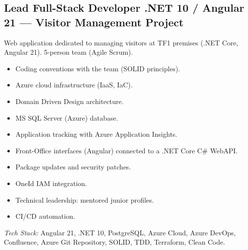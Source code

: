 \documentclass[10pt,a4paper]{article}
\begin{document}
\vspace{6pt}

\subsection*{Lead Full-Stack Developer .NET 10 / Angular 21 --- Visitor Management Project}
\color{darkgray}
Web application dedicated to managing visitors at TF1 premises (.NET Core, Angular 21). 5-person team (Agile Scrum).
\begin{itemize}
  \item Coding conventions with the team (SOLID principles).
  \item Azure cloud infrastructure (IaaS, IaC).
  \item Domain Driven Design architecture.
  \item MS SQL Server (Azure) database.
  \item Application tracking with Azure Application Insights.
  \item Front-Office interfaces (Angular) connected to a .NET Core C\# WebAPI.
  \item Package updates and security patches.
  \item OneId IAM integration.
  \item Technical leadership: mentored junior profiles.
  \item CI/CD automation.
\end{itemize}
\textit{Tech Stack:} Angular 21, .NET 10, PostgreSQL, Azure Cloud, Azure DevOps, Confluence, Azure Git Repository, SOLID, TDD, Terraform, Clean Code.

\vspace{6pt}
\end{document}
